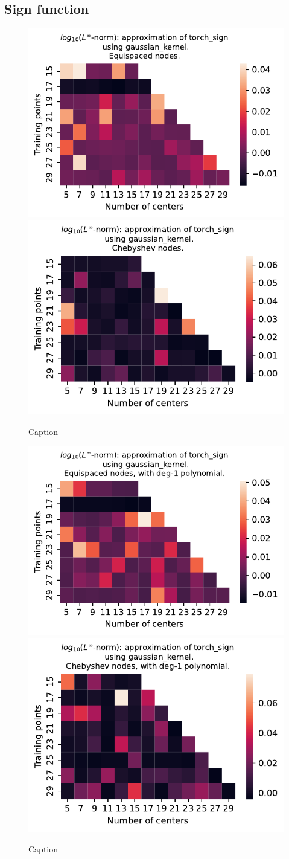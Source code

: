 \documentclass[12pt]{report} %
\begin{document}
\subsection*{Sign function}

\begin{figure}[ht]
  \centering

  \includegraphics[width=.49\textwidth]{imagenes/experiments/1d/variational/torch_sign-Kgaussian_kernel-Equi.pdf}
  \includegraphics[width=.49\textwidth]{imagenes/experiments/1d/variational/torch_sign-Kgaussian_kernel-Cheb.pdf}
  \caption{Caption}
  \label{fig:torch-sign-gaussian}
\end{figure}


\begin{figure}[ht]
  \centering

  \includegraphics[width=.49\textwidth]{imagenes/experiments/1d/variational/torch_sign-Kgaussian_kernel-Poly-Equi.pdf}
  \includegraphics[width=.49\textwidth]{imagenes/experiments/1d/variational/torch_sign-Kgaussian_kernel-Poly-Cheb.pdf}
  \caption{Caption}
  \label{fig:torch-sign-gaussian-poly}
\end{figure}
\end{document}
